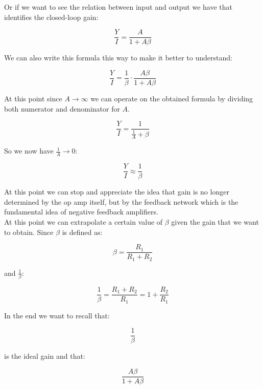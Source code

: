\documentclass[../main.tex]{subfiles}
\begin{document}
Or if we want to see the relation between input and output we have that identifies the closed-loop gain:

\begin{equation}
	\frac{Y}{I} = \frac{A}{1 + A\beta}
\end{equation}

We can also write this formula this way to make it better to understand:

\begin{equation}
	\frac{Y}{I} = \frac{1}{\beta} \cdot \frac{A \beta }{1 + A\beta} 
\label{solvex}
\end{equation}

At this point since $A \rightarrow \infty$ we can operate on the obtained formula by dividing both numerator and denominator for $A$.

\begin{equation}
	\frac{Y}{I} = \frac{1}{\frac{1}{A} + \beta}
\end{equation}

So we now have $\frac{1}{A} \rightarrow 0$:

\begin{equation}
	\frac{Y}{I} \approx \frac{1}{\beta}
\end{equation}

At this point we can stop and appreciate the idea that gain is no longer determined by the op amp itself, but by the feedback network which is the fundamental idea of negative feedback amplifiers.\\

At this point we can extrapolate a certain value of $\beta$ given the gain that we want to obtain. Since $\beta$ is defined as:

\begin{equation}
	\beta = \frac{R_1}{R_1 + R_2}
\end{equation}

and $\frac{1}{\beta}$:

\begin{equation}
	\frac{1}{\beta} = \frac{R_1 + R_2}{R_1} = 1 + \frac{R_2}{R_1}
\end{equation}

In the end we want to recall that:

\begin{equation}
	\frac{1}{\beta}
\end{equation}

is the ideal gain and that:

\begin{equation}
	\frac{A\beta}{1 + A\beta}
\end{equation}
\end{document}
